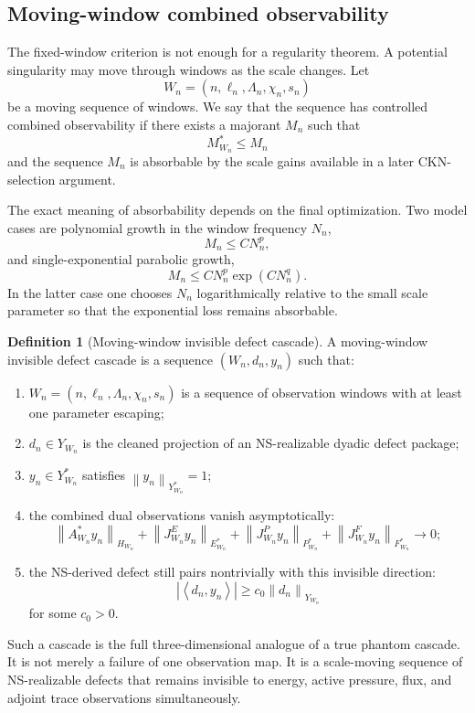 \documentclass[11pt]{article}
\numberwithin{equation}{section}
\theoremstyle{plain}
\theoremstyle{definition}
\newtheorem{definition}[theorem]{Definition}
\theoremstyle{remark}
\newcommand{\norm}[2]{\left\|#1\right\|_{#2}}
\newcommand{\pair}[2]{\left\langle #1,#2\right\rangle}
\begin{document}
\subsection{Moving-window combined observability}

The fixed-window criterion is not enough for a regularity theorem.  A potential singularity may move through windows as the scale changes.  Let
\[
  W_n=(n,\ell_n,\Lambda_n,\chi_n,s_n)
\]
be a moving sequence of windows.  We say that the sequence has controlled combined observability if there exists a majorant \(M_n\) such that
\[
  M_{W_n}^*\le M_n
\]
and the sequence \(M_n\) is absorbable by the scale gains available in a later CKN-selection argument.

The exact meaning of absorbability depends on the final optimization.  Two model cases are polynomial growth in the window frequency \(N_n\),
\[
  M_n\le C N_n^p,
\]
and single-exponential parabolic growth,
\[
  M_n\le C N_n^p\exp(CN_n^q).
\]
In the latter case one chooses \(N_n\) logarithmically relative to the small scale parameter so that the exponential loss remains absorbable.

\begin{definition}[Moving-window invisible defect cascade]
A moving-window invisible defect cascade is a sequence \((W_n,d_n,y_n)\) such that:
\begin{enumerate}
  \item \(W_n=(n,\ell_n,\Lambda_n,\chi_n,s_n)\) is a sequence of observation windows with at least one parameter escaping;
  \item \(d_n\in Y_{W_n}\) is the cleaned projection of an NS-realizable dyadic defect package;
  \item \(y_n\in Y_{W_n}^*\) satisfies \(\norm{y_n}{Y_{W_n}^*}=1\);
  \item the combined dual observations vanish asymptotically:
  \[
  \norm{A_{W_n}^*y_n}{H_{W_n}}
  +\norm{J_{W_n}^Ey_n}{E_{W_n}^*}
  +\norm{J_{W_n}^Py_n}{P_{W_n}^*}
  +\norm{J_{W_n}^Fy_n}{F_{W_n}^*}
  \to0;
  \]
  \item the NS-derived defect still pairs nontrivially with this invisible direction:
  \[
  |\pair{d_n}{y_n}|
  \ge
  c_0\norm{d_n}{Y_{W_n}}
  \]
  for some \(c_0>0\).
\end{enumerate}
\end{definition}

Such a cascade is the full three-dimensional analogue of a true phantom cascade.  It is not merely a failure of one observation map.  It is a scale-moving sequence of NS-realizable defects that remains invisible to energy, active pressure, flux, and adjoint trace observations simultaneously.
\end{document}
